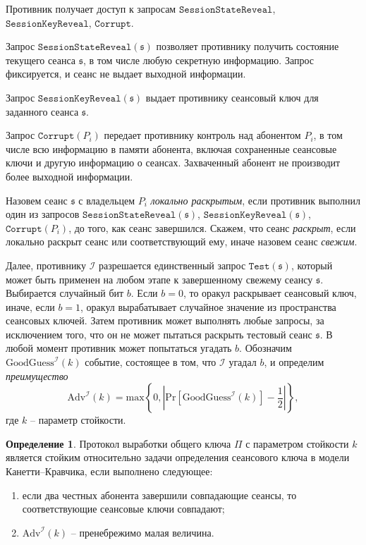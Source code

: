 \documentclass[a4paper,12pt]{article}
\theoremstyle{definition}
\newtheorem{definition}{Определение}
\begin{document}
Противник получает доступ к запросам $\mathtt{SessionStateReveal}$, $\mathtt{SessionKeyReveal}$, $\mathtt{Corrupt}$. 

Запрос $\mathtt{SessionStateReveal}(\mathfrak{s})$ позволяет противнику получить состояние текущего сеанса $\mathfrak{s}$, в том числе любую секретную информацию. Запрос фиксируется, и сеанс 
не выдает выходной информации.

Запрос  $\mathtt{SessionKeyReveal}(\mathfrak{s})$ выдает противнику сеансовый ключ для заданного сеанса $\mathfrak{s}$.

Запрос $\mathtt{Corrupt}(P_i)$ передает противнику контроль над абонентом $P_i$, в том числе всю информацию в памяти абонента, включая сохраненные сеансовые ключи и другую информацию о сеансах. Захваченный абонент не производит более выходной информации.

Назовем сеанс $\mathfrak{s}$  с владельцем $P_i$ \emph{локально раскрытым}, если противник выполнил один из запросов $\mathtt{SessionStateReveal}(\mathfrak{s})$, $\mathtt{SessionKeyReveal}(\mathfrak{s})$, $\mathtt{Corrupt}(P_i)$, до того, как сеанс завершился. Скажем, что сеанс \emph{раскрыт}, если локально раскрыт сеанс или соответствующий ему, иначе назовем сеанс \emph{свежим}.

Далее, противнику $\mathcal{I}$ разрешается единственный запрос $\mathtt{Test}(\mathfrak{s})$, который может быть применен на любом этапе к завершенному свежему сеансу $\mathfrak{s}$.
Выбирается случайный бит $b$. Если $b=0$, то оракул раскрывает сеансовый ключ, иначе, если $b=1$, оракул вырабатывает случайное значение из пространства сеансовых ключей. Затем противник может выполнять любые запросы, за исключением того, что он не может пытаться раскрыть тестовый сеанс $\mathfrak{s}$. В любой момент противник может попытаться угадать $b$. Обозначим
$\mathrm{GoodGuess}^{\mathcal{I}}(k)$ событие, состоящее в том, что $\mathcal{I}$ угадал $b$, и определим \emph{преимущество}
$$
\mathrm{Adv}^{\mathcal{I}}(k)=\mathrm{max}\left\{0,\left|\mathrm{Pr}[\mathrm{GoodGuess}^{\mathcal{I}}(k)]-\frac{1}{2}\right|\right\},
$$
где $k$ -- параметр стойкости.

\begin{definition}
 Протокол выработки общего ключа $\Pi$ с параметром стойкости $k$ является стойким относительно задачи определения сеансового ключа в модели Канетти--Кравчика, если выполнено следующее:
 \begin{enumerate} 
  \item если два честных абонента завершили совпадающие сеансы, то соответствующие сеансовые ключи совпадают; 
  \item $\mathrm{Adv}^{\mathcal{I}}(k)$ -- пренебрежимо малая величина.
 \end{enumerate}

\end{definition}
\end{document}
